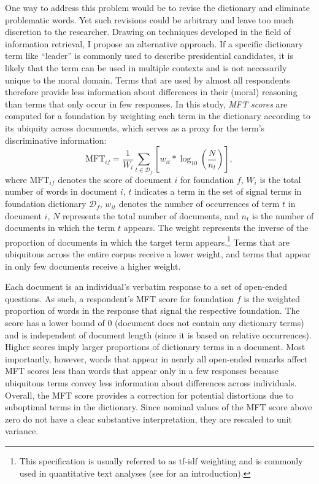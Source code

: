 \documentclass[12pt]{article}
\begin{document}
One way to address this problem would be to revise the dictionary and eliminate problematic words. Yet such revisions could be arbitrary and leave too much discretion to the researcher. Drawing on techniques developed in the field of information retrieval, I propose an alternative approach. If a specific dictionary term like ``leader'' is commonly used to describe presidential candidates, it is likely that the term can be used in multiple contexts and is not necessarily unique to the moral domain. Terms that are used by almost all respondents therefore provide less information about differences in their (moral) reasoning than terms that only occur in few responses. In this study, \textit{MFT scores} are computed for a foundation by weighting each term in the dictionary according to its ubiquity across documents, which serves as a proxy for the term's discriminative information:
\begin{equation}\label{eq:tfidf}
\text{MFT}_{if} = \dfrac{1}{W_i} \sum_{t \in \mathcal{D}_f} \left[ w_{it} * \log_{10}\left( \dfrac{N}{n_t}\right) \right],
\end{equation}
where $\text{MFT}_{if}$ denotes the score of document $i$ for foundation $f$, $W_i$ is the total number of words in document $i$, $t$ indicates a term in the set of signal terms in foundation dictionary $\mathcal{D}_f$, $w_{it}$ denotes the number of occurrences of term $t$ in document $i$, $N$ represents the total number of documents, and $n_t$ is the number of documents in which the term $t$ appears. The weight represents the inverse of the proportion of documents in which the target term appears.\footnote{This specification is usually referred to as tf-idf weighting and is commonly used in quantitative text analyses (see \citealt[ch. 6]{manning2008introduction} for an introduction).} Terms that are ubiquitous across the entire corpus receive a lower weight, and terms that appear in only few documents receive a higher weight. %

Each document is an individual's verbatim response to a set of open-ended questions. As such, a respondent's MFT score for foundation $f$ is the weighted proportion of words in the response that signal the respective foundation. The score has a lower bound of 0 (document does not contain any dictionary terms) and is independent of document length (since it is based on relative occurrences). Higher scores imply larger proportions of dictionary terms in a document. Most importantly, however, words that appear in nearly all open-ended remarks affect MFT scores less than words that appear only in a few responses because ubiquitous terms convey less information about differences across individuals. Overall, the MFT score provides a correction for potential distortions due to suboptimal terms in the dictionary. Since nominal values of the MFT score above zero do not have a clear substantive interpretation, they are rescaled to unit variance.
\end{document}
